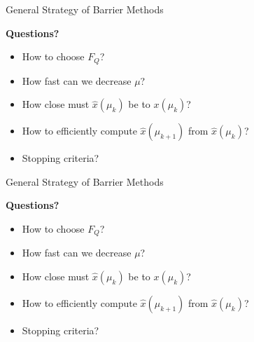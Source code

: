 \documentclass[9pt]{beamer}
\begin{document}
\begin{frame}{General Strategy of Barrier Methods}

  \begin{algorithm}[H]
    \caption{General Barrier Method}
  \end{algorithm}

  \vfill
  
  \textbf{Questions?}
  \begin{itemize}
  \item How to choose $F_Q$?
  \item How fast can we decrease $\mu$?
  \item How close must $\hat x(\mu_k)$ be to $x(\mu_k)$?
  \item How to efficiently compute $\hat x(\mu_{k+1})$ from $\hat x(\mu_{k})$?
  \item Stopping criteria?
  \end{itemize}
  
\end{frame}



\begin{frame}{General Strategy of Barrier Methods}

  \begin{algorithm}[H]
    \caption{General Barrier Method}
  \end{algorithm}

  \vfill
  
  \textbf{Questions?}
  \begin{itemize}
  \item How to choose $F_Q$? \hfill {}
  \item How fast can we decrease $\mu$? \hfill {}
  \item How close must $\hat x(\mu_k)$ be to $x(\mu_k)$? \hfill {}
  \item How to efficiently compute $\hat x(\mu_{k+1})$ from $\hat x(\mu_{k})$? \hfill {}
  \item Stopping criteria? \hfill {}
  \end{itemize}
  
\end{frame}
\end{document}
